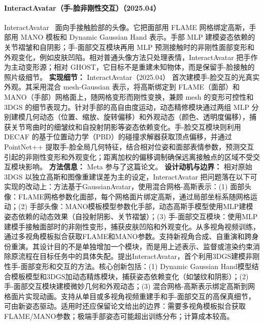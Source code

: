 \paragraph{InteractAvatar（手-脸非刚性交互）（2025.04）}
InteractAvatar~\cite{2504_07949} 面向手接触脸部的头像。它把面部用 FLAME 网格绑定高斯，手部用 MANO 模板和 Dynamic Gaussian Hand 表示。手部 MLP 建模姿态依赖的关节褶皱和自阴影；手-面部交互模块再用 MLP 预测接触时的非刚性面部变形和外观变化，例如皮肤凹陷。相对普通头像方法只处理表情，InteractAvatar 把手作为主动变形源；相对 GHOST，它目标不是重建未知物体，而是保留手-脸接触的照片级细节。
\textbf{实现细节：} InteractAvatar（2025.04） 首次建模手-脸交互的光真实外观。其采用混合 mesh-Gaussian 表示，将高斯绑定到 FLAME（面部）和 MANO（手部）网格面上，随网格变形而刚性变换，兼顾 mesh 的变形可控性和 3DGS 的细节表现力。针对手部的高自由度运动，动态精修模块通过两组 MLP 分别建模几何动态（位置、缩放、旋转偏移）和外观动态（颜色、透明度偏移），捕获关节弯曲时的细皱纹和自投射阴影等姿态依赖变化。手-脸交互模块则利用 DECAF 的基于位置动力学（PBD）的碰撞求解器获取顶点偏移，并通过 PointNet++ 提取手-脸全局几何特征，结合相对位姿和面部表情参数，预测交互引起的非刚性变形和外观变化；距离加权的偏移调制确保远离接触点的区域不受交互模块影响。
\textbf{方法信息：} Meta 参与了这篇论文。
\textbf{设计动机与边界：} 相对原始 3DGS 以独立高斯和图像重建误差为主的设定，InteractAvatar 把问题落在以下可实现的改动上：方法基于GaussianAvatar，使用混合网格-高斯表示：(1) 面部头像：FLAME网格参数化面部，每个网格面片绑定高斯，通过局部坐标系随网格运动；(2) 手部头像：MANO模板模型参数化手部，动态高斯手模型使用MLP建模姿态依赖的动态效果（自投射阴影、关节褶皱）；(3) 手-面部交互模块：使用MLP建模手接触面部时的非刚性变形，捕获皮肤凹陷和外观变化。从多视角视频训练，通过多视角模板拟合获取FLAME和MANO参数。支持新视角合成、自重演和跨身份重演。其设计目的不是单独增加一个模块，而是用上述表示、监督或渲染约束消除原流程在目标任务中的具体失配。提出InteractAvatar，首个利用3DGS建模非刚性手-面部变形和交互的方法。核心创新包括：(1) Dynamic Gaussian Hand模型结合模板模型和3DGS加动态精炼模块，捕获姿态依赖变化（如皱纹和阴影）；(2) 手-面部交互模块建模微妙几何和外观动态；(3) 混合网格-高斯表示绑定高斯到网格面片实现动画。支持从单目或多视角视频重建手和手-面部交互的高保真细节，可由新姿态驱动。适用时还应保留论文给出的边界：需要多视角模板拟合获取FLAME/MANO参数；极端手部姿态可能超出训练分布；计算成本较高。
